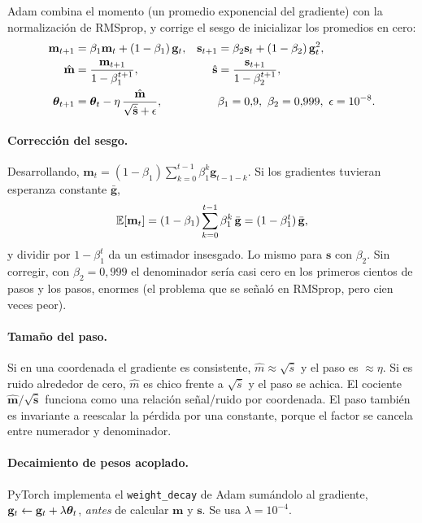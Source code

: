 Adam combina el momento (un promedio exponencial del gradiente) con la normalización de RMSprop, y corrige el sesgo de
inicializar los promedios en cero:
\begin{align}
  \mathbf{m}_{t+1} &= \beta_1\mathbf{m}_t + (1 - \beta_1)\,\mathbf{g}_t, &
  \mathbf{s}_{t+1} &= \beta_2\mathbf{s}_t + (1 - \beta_2)\,\mathbf{g}_t^2, \nonumber\\
  \hat{\mathbf{m}} &= \frac{\mathbf{m}_{t+1}}{1 - \beta_1^{t+1}}, &
  \hat{\mathbf{s}} &= \frac{\mathbf{s}_{t+1}}{1 - \beta_2^{t+1}}, \label{eq:adam}\\
  \boldsymbol{\theta}_{t+1} &= \boldsymbol{\theta}_t - \eta\,\frac{\hat{\mathbf{m}}}{\sqrt{\hat{\mathbf{s}}} + \epsilon}, &
  &\beta_1 = 0{,}9,\ \beta_2 = 0{,}999,\ \epsilon = 10^{-8}. \nonumber
\end{align}

\paragraph{Corrección del sesgo.} Desarrollando, $\mathbf{m}_t = (1 - \beta_1)\sum_{k=0}^{t-1}\beta_1^{k}\mathbf{g}_{t-1-k}$. Si los
gradientes tuvieran esperanza constante $\bar{\mathbf{g}}$,
\[
  \mathbb{E}[\mathbf{m}_t] = (1 - \beta_1)\sum_{k=0}^{t-1}\beta_1^k\,\bar{\mathbf{g}} = (1 - \beta_1^t)\,\bar{\mathbf{g}},
\]
y dividir por $1 - \beta_1^t$ da un estimador insesgado. Lo mismo para $\mathbf{s}$ con $\beta_2$. Sin corregir, con
$\beta_2 = 0{,}999$ el denominador sería casi cero en los primeros cientos de pasos y los pasos, enormes (el problema que se
señaló en RMSprop, pero cien veces peor).

\paragraph{Tamaño del paso.} Si en una coordenada el gradiente es consistente, $\hat m \approx \sqrt{\hat s}$ y el paso es
$\approx\eta$. Si es ruido alrededor de cero, $\hat m$ es chico frente a $\sqrt{\hat s}$ y el paso se achica. El cociente
$\hat{\mathbf{m}}/\sqrt{\hat{\mathbf{s}}}$ funciona como una relación señal/ruido por coordenada. El paso también es invariante a
reescalar la pérdida por una constante, porque el factor se cancela entre numerador y denominador.

\paragraph{Decaimiento de pesos acoplado.} PyTorch implementa el \texttt{weight\_decay} de Adam sumándolo al gradiente,
$\mathbf{g}_t \leftarrow \mathbf{g}_t + \lambda\boldsymbol{\theta}_t$, \emph{antes} de calcular $\mathbf{m}$ y $\mathbf{s}$. Se usa $\lambda = 10^{-4}$.

